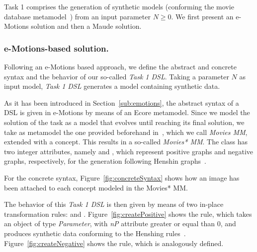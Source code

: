 
Task 1 comprises the generation of synthetic models (conforming the movie database metamodel~\cite{imdbcase}) from an input parameter $N \geq 0$. We first present an e-Motions solution and then a Maude solution. 


\subsubsection{e-Motions-based solution.}

Following an e-Motions based approach, we define the abstract and concrete syntax and the behavior of our so-called \textit{Task 1 DSL}. Taking a parameter $N$ as input model, \textit{Task 1 DSL} generates a model containing synthetic data.

As it has been introduced in Section~\ref{sub:emotions}, the abstract syntax of a DSL is given in e-Motions by means of an Ecore metamodel. Since we model the solution of the task as a model that evolves until reaching its final solution, we take as metamodel the one provided beforehand in~\cite{imdbsources}, which we call \textit{Movies MM}, extended with a  concept. This results in a so-called \textit{Movies* MM}. The class  has two integer attributes, namely  and , which represent positive graphs and negative graphs, respectively, for the generation following Henshin graphs~\cite{Henshin:10}.

For the concrete syntax, Figure~\ref{fig:concreteSyntax} shows how an image has been attached to each concept modeled in the Movies* MM. 

The behavior of this \textit{Task 1 DSL} is then given by means of two in-place transformation rules:  and . Figure~\ref{fig:createPositive} shows the  rule, which takes an object  of type \textit{Parameter}, with \textit{nP} attribute greater or equal than $0$, and produces synthetic data conforming to the Henshing rules~\cite{Henshin:10}. Figure~\ref{fig:createNegative} shows the  rule, which is analogously defined.

